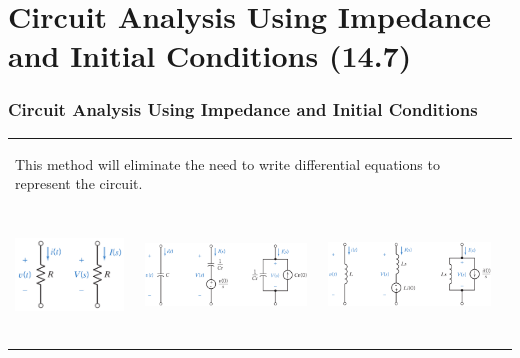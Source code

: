 \documentclass[aspectratio=169]{beamer}
\begin{document}
\section{Circuit Analysis Using Impedance and Initial Conditions (14.7)}
\begin{frame}[fragile]
	\frametitle{Circuit Analysis Using Impedance and Initial Conditions}
\begin{tabular}{ll}
	\begin{columns}
		\begin{column}{1\textwidth}  %
		This method will eliminate the need to write differential equations
to represent the circuit.
		\end{column}
	\end{columns}\\
		\begin{columns}
		\begin{column}{.3\textwidth}  %
\center		\includegraphics[width=3cm,height=2.5cm]{figure13.png}	
		\end{column}
		\begin{column}{.4\textwidth}  %
\center		\includegraphics[width=4.5cm,height=2.5cm]{figure14.png}	
		\end{column}
		\begin{column}{.4\textwidth}  %
\center		\includegraphics[width=4.5cm,height=2.5cm]{figure15.png}	
		\end{column}
	\end{columns}\\
			\begin{columns}
\footnotesize		\begin{column}{.3\textwidth}  %

\end{column}
\end{columns}
\end{tabular}
\end{frame}
\end{document}
